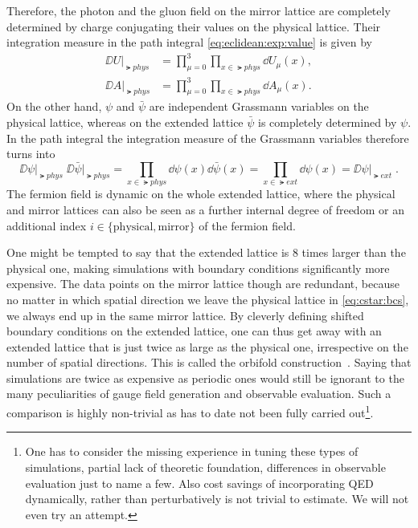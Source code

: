Therefore, the photon and the gluon field on the mirror lattice are completely determined by charge conjugating their values on the physical lattice. Their integration measure in the path integral \cref{eq:eclidean:exp:value} is given by
\begin{align}
\DD U \big\rvert_{\lat{phys}} &= \prod_{\mu=0}^{3} \prod_{x \in \lat{phys}} \dd U_{\mu}(x), \\
\DD A \big\rvert_{\lat{phys}} &= \prod_{\mu=0}^{3} \prod_{x \in \lat{phys}} \dd A_{\mu}(x).
\end{align}
On the other hand, $\psi$ and $\bar{\psi}$ are independent Grassmann variables on the physical lattice, whereas on the extended lattice $\bar{\psi}$ is completely determined by $\psi$. In the path integral the integration measure of the Grassmann variables therefore turns into
\begin{equation}
\DD \psi       \big\rvert_{\lat{phys}} \;
\DD \bar{\psi} \big\rvert_{\lat{phys}}
= \prod_{x \in \lat{phys}} \dd \psi(x) \dd \bar{\psi}(x)
= \prod_{x \in \lat{ext}}  \dd \psi(x)
= \DD \psi \big\rvert_{\lat{ext}} \;.
\end{equation}
The fermion field is dynamic on the whole extended lattice, where the physical and mirror lattices can also be seen as a further internal degree of freedom or an additional index $i \in \{ \text{physical}, \text{mirror} \}$ of the fermion field. 

One might be tempted to say that the extended lattice is \num{8} times larger than the physical one, making simulations with \Cstar boundary conditions significantly more expensive.
The data points on the mirror lattice though are redundant, because no matter in which spatial direction we leave the physical lattice in \cref{eq:cstar:bcs}, we always end up in the same mirror lattice.
By cleverly defining shifted boundary conditions on the extended lattice, one can thus get away with an extended lattice that is just twice as large as the physical one, irrespective on the number of spatial \Cstar directions.
This is called the orbifold construction~\cite{openqxd}.
Saying that \Cstar simulations are twice as expensive as periodic ones would still be ignorant to the many peculiarities of gauge field generation and observable evaluation.
Such a comparison is highly non-trivial as has to date not been fully carried out\footnote{One has to consider the missing experience in tuning these types of simulations, partial lack of theoretic foundation, differences in observable evaluation just to name a few. Also cost savings of incorporating QED dynamically, rather than perturbatively is not trivial to estimate. We will not even try an attempt.}.

